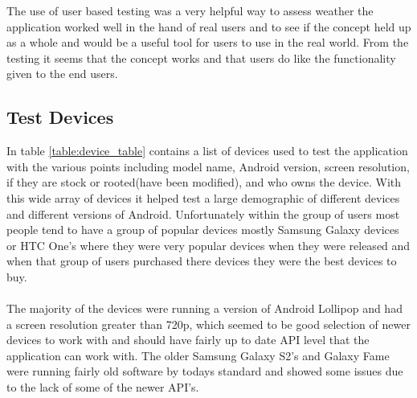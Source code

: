 \noindent
The use of user based testing was a very helpful way to assess weather the application worked well in the hand of real users and to see if the concept held up as a whole and would be a useful tool for users to use in the real world. From the testing it seems that the concept works and that users do like the functionality given to the end users.

\subsection{Test Devices}

In table \ref{table:device_table} contains a list of devices used to test the application with the various points including model name, Android version, screen resolution, if they are stock or rooted(have been modified), and who owns the device. With this wide array of devices it helped test a large demographic of different devices and different versions of Android. Unfortunately within the group of users most people tend to have a group of popular devices mostly Samsung Galaxy devices or HTC One's where they were very popular devices when they were released and when that group of users purchased there devices they were the best devices to buy.\\
\\
The majority of the devices were running a version of Android Lollipop and had a screen resolution greater than 720p, which seemed to be good selection of newer devices to work with and should have fairly up to date API level that the application can work with. The older Samsung Galaxy S2's and Galaxy Fame were running fairly old software by todays standard and showed some issues due to the lack of some of the newer API's.

